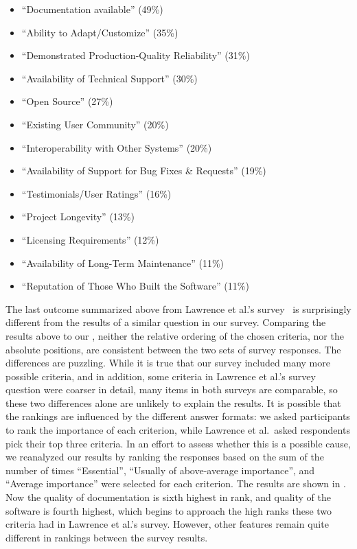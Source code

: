 \documentclass{casicswhitepaper}
\begin{document}
\begin{itemize}
\begin{itemize}[itemsep=0.2ex]
\item ``Documentation available'' (49\%)
\item ``Ability to Adapt/Customize'' (35\%)
\item ``Demonstrated Production-Quality Reliability'' (31\%)
\item ``Availability of Technical Support'' (30\%)
\item ``Open Source'' (27\%)
\item ``Existing User Community'' (20\%)
\item ``Interoperability with Other Systems'' (20\%)
\item ``Availability of Support for Bug Fixes \& Requests'' (19\%)
\item ``Testimonials/User Ratings'' (16\%)
\item ``Project Longevity'' (13\%)
\item ``Licensing Requirements'' (12\%)
\item ``Availability of Long-Term Maintenance'' (11\%)
\item ``Reputation of Those Who Built the Software'' (11\%)
\end{itemize}

\end{itemize}

The last outcome summarized above from Lawrence et al.'s survey~\cite{lawrence2015science} is surprisingly different from the results of a similar question in our survey.  Comparing the results above to our , neither the relative ordering of the chosen criteria, nor the absolute positions, are consistent between the two sets of survey responses.  The differences are puzzling.  While it is true that our survey included many more possible criteria, and in addition, some criteria in Lawrence et al.'s survey question were coarser in detail, many items in both surveys are comparable, so these two differences alone are unlikely to explain the results.  It is possible that the rankings are influenced by the different answer formats: we asked participants to rank the importance of each criterion, while Lawrence et al.\ asked respondents pick their top three criteria.  In an effort to assess whether this is a possible cause, we reanalyzed our results by ranking the responses based on the sum of the number of times ``Essential'', ``Usually of above-average importance'', and ``Average importance'' were selected for each criterion.  The results are shown in .  Now the quality of documentation is sixth highest in rank, and quality of the software is fourth highest, which begins to approach the high ranks these two criteria had in Lawrence et al.'s survey.  However, other features remain quite different in rankings between the survey results.
\end{document}

